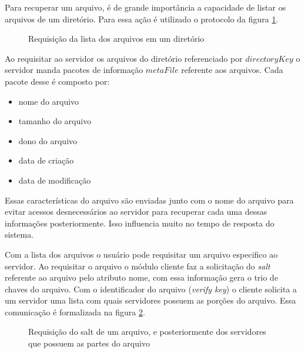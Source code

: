         Para recuperar um arquivo, é de grande importância a capacidade de listar os arquivos de um diretório. Para essa ação é utilizado o protocolo da figura \ref{fig:protListFiles}.
        
        \begin{figure}[!ht]
        \caption{Requisição da lista dos arquivos em um diretório}
        \label{fig:protListFiles}
        \end{figure}
        
        Ao requisitar ao servidor os arquivos do diretório referenciado por $directoryKey$ o servidor manda pacotes de informação $metaFile$ referente aos arquivos. Cada pacote desse é composto por:
        \begin{itemize}
            \item nome do arquivo
            \item tamanho do arquivo
            \item dono do arquivo
            \item data de criação
            \item data de modificação
        \end{itemize}
        
        Essas características do arquivo são enviadas junto com o nome do arquivo para evitar acessos desnecessários ao servidor para recuperar cada uma dessas informações posteriormente. Isso influencia muito no tempo de resposta do sistema.
        
        Com a lista dos arquivos o usuário pode requisitar um arquivo especifico ao servidor. Ao requisitar o arquivo o módulo cliente faz a solicitação do \textit{salt} referente ao arquivo pelo atributo nome, com essa informação gera o trio de chaves do arquivo. Com o identificador do arquivo (\textit{verify key}) o cliente solicita a um servidor uma lista com quais servidores possuem as porções do arquivo. Essa comunicação é formalizada na figura \ref{fig:protWhoHasParts}.
        
         \begin{figure}[!ht]

        \caption{Requisição do salt de um arquivo, e posteriormente dos servidores que possuem as partes do arquivo}
        \label{fig:protWhoHasParts}
        \end{figure}
        
